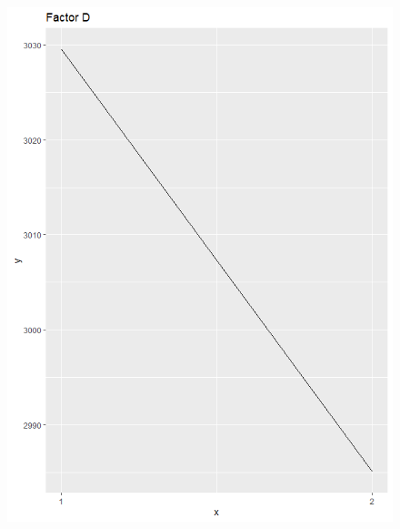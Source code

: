 \begin{figure}[H]
	\begin{minipage}[b]{0.33\linewidth}
		\centering
		\includegraphics[width=1\linewidth]{simulations/taguchi/plots/main_effect_d} 
	\end{minipage}%
	\begin{minipage}[b]{0.33\linewidth}
		\centering

\end{minipage}
\end{figure}
